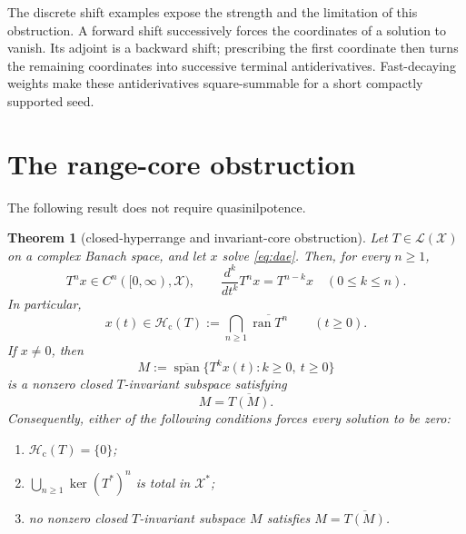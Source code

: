 \documentclass[11pt]{article}
\newtheorem{theorem}{Theorem}
\newcommand{\X}{\mathcal X}
\newcommand{\Hc}{\mathcal H_{\mathrm c}}
\DeclareMathOperator{\ran}{ran}
\begin{document}
The discrete shift examples expose the strength and the limitation of this
obstruction.  A forward shift successively forces the coordinates of a
solution to vanish.  Its adjoint is a backward shift; prescribing the first
coordinate then turns the remaining coordinates into successive terminal
antiderivatives.  Fast-decaying weights make these antiderivatives
square-summable for a short compactly supported seed.

\section{The range-core obstruction}

The following result does not require quasinilpotence.

\begin{theorem}[closed-hyperrange and invariant-core obstruction]
\label{thm:range}
Let $T\in\mathcal L(\X)$ on a complex Banach space, and let $x$ solve
\eqref{eq:dae}.  Then, for every $n\geq1$,
\begin{equation}\label{eq:regularity}
 T^n x\in C^n([0,\infty),\X),\qquad
 \frac{d^k}{dt^k}T^n x=T^{n-k}x\quad(0\leq k\leq n).
\end{equation}
In particular,
\begin{equation}\label{eq:closed-hyperrange}
 x(t)\in \Hc(T):=\bigcap_{n\geq1}\overline{\ran T^n}
 \qquad(t\geq0).
\end{equation}
If $x\ne0$, then
\begin{equation}\label{eq:M}
 M:=\overline{\operatorname{span}}
 \{T^k x(t):k\geq0,\ t\geq0\}
\end{equation}
is a nonzero closed $T$-invariant subspace satisfying
\begin{equation}\label{eq:dense-range}
 M=\overline{T(M)}.
\end{equation}
Consequently, either of the following conditions forces every solution to be
zero:
\begin{enumerate}
 \item $\Hc(T)=\{0\}$;
 \item $\bigcup_{n\geq1}\ker (T^*)^n$ is total in $\X^*$;
 \item no nonzero closed $T$-invariant subspace $M$ satisfies
       $M=\overline{T(M)}$.
\end{enumerate}
\end{theorem}
\end{document}
